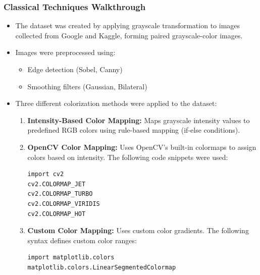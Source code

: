 \documentclass[conference]{IEEEtran}
\begin{document}
\subsubsection{Classical Techniques Walkthrough}
\label{sec:Classical_techniques}
\begin{itemize}
    \item The dataset was created by applying grayscale transformation to images collected from Google and Kaggle, forming paired grayscale-color images.
    \item Images were preprocessed using:
    \begin{itemize}
        \item Edge detection (Sobel, Canny)
        \item Smoothing filters (Gaussian, Bilateral)
    \end{itemize}
    \item Three different colorization methods were applied to the dataset:
    \begin{enumerate}
        \item \textbf{Intensity-Based Color Mapping:} Maps grayscale intensity values to predefined RGB colors using rule-based mapping (if-else conditions).
        \item \textbf{OpenCV Color Mapping:} Uses OpenCV’s built-in colormaps to assign colors based on intensity. The following code snippets were used:
        \begin{lstlisting}
import cv2
cv2.COLORMAP_JET
cv2.COLORMAP_TURBO
cv2.COLORMAP_VIRIDIS
cv2.COLORMAP_HOT
        \end{lstlisting}
        \item \textbf{Custom Color Mapping:} Uses custom color gradients. The following syntax defines custom color ranges:
        \begin{lstlisting}
import matplotlib.colors
matplotlib.colors.LinearSegmentedColormap
        \end{lstlisting}
    \end{enumerate}
\end{itemize}
\end{document}
